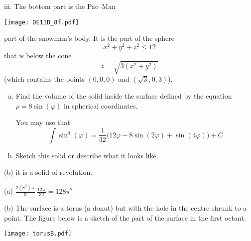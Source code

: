 \begin{solution}
iii. The bottom part is the Pac--Man
\begin{center}
     \texttt{[image: OE11D\_8f.pdf]}
\end{center}
part of the snowman's body. It is the part of the sphere
\begin{equation*}
x^2+y^2+z^2\le 12
\end{equation*}
that is below the cone
\begin{equation*}
z = \sqrt{3(x^2+y^2)}
\end{equation*}
(which contains the points $(0,0,0)$ and $(\sqrt{3},0,3)$).
\end{solution}

\begin{question}[M200 2013D] %
\begin{enumerate}[(a)]
\item
Find the volume of the solid inside the surface defined by the equation 
$\rho = 8 \sin(\varphi)$ in spherical coordinates.

You may use that
\begin{equation*}
\int \sin^4(\varphi) =\frac{1}{32}\big(12\varphi -8\sin(2\varphi)
+\sin(4\varphi)\big) +C
\end{equation*}

\item
Sketch this solid or describe what it looks like. 
\end{enumerate}
\end{question}

\begin{hint}
(b) it is a solid of revolution.
\end{hint}

\begin{answer}
(a) $\frac{2(8^3)\,\pi}{3}\ \frac{12\,\pi}{32}=128\pi^2$

(b) The surface is a torus (a donut) but with the hole in the centre 
shrunk to a point.
The figure below is a sketch of the part of the surface in the
first octant.

\begin{center}
     \texttt{[image: torusB.pdf]}
\end{center}
\end{answer}


